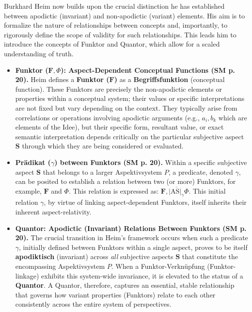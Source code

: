 \documentclass[12pt]{article}
\newcommand{\aspektivsystem}{P}
\newcommand{\funktor}{\bm{F}}
\begin{document}
Burkhard Heim now builds upon the crucial distinction he has established between apodictic (invariant) and non-apodictic (variant) elements. His aim is to formalize the nature of relationships between concepts and, importantly, to rigorously define the scope of validity for such relationships. This leads him to introduce the concepts of Funktor and Quantor, which allow for a scaled understanding of truth.

\begin{itemize}
    \item \textbf{Funktor (\( \funktor, \Phi \)): Aspect-Dependent Conceptual Functions (SM p. 20).}
    Heim defines a \textbf{Funktor (\(\funktor\))} as a \textbf{Begriffsfunktion} (conceptual function). These Funktors are precisely the non-apodictic elements or properties within a conceptual system; their values or specific interpretations are not fixed but vary depending on the context. They typically arise from correlations or operations involving apodictic arguments (e.g., \( a_i, b_k \) which are elements of the Idee), but their specific form, resultant value, or exact semantic interpretation depends critically on the particular subjective aspect \( \mathbf{S} \) through which they are being considered or evaluated. 

    \item \textbf{Prädikat (\( \gamma \)) between Funktors (SM p. 20).}
    Within a specific subjective aspect \( \mathbf{S} \) that belongs to a larger Aspektivsystem \( \aspektivsystem \), a predicate, denoted \( \gamma \), can be posited to establish a relation between two (or more) Funktors, for example, \( \funktor \) and \( \Phi \). This relation is expressed as: \( \funktor, \overline{|\mathrm{AS}|_{\gamma}} \Phi \). This initial relation \( \gamma \), by virtue of linking aspect-dependent Funktors, itself inherits their inherent aspect-relativity.

    \item \textbf{Quantor: Apodictic (Invariant) Relations Between Funktors (SM p. 20).}
    The crucial transition in Heim's framework occurs when such a predicate \( \gamma \), initially defined between Funktors within a single aspect, proves to be itself \textbf{apodiktisch} (invariant) across \textit{all} subjective aspects \( \mathbf{S} \) that constitute the encompassing Aspektivsystem \( \aspektivsystem \). When a Funktor-Verknüpfung (Funktor-linkage) exhibits this system-wide invariance, it is elevated to the status of a \textbf{Quantor}. A Quantor, therefore, captures an essential, stable relationship that governs how variant properties (Funktors) relate to each other consistently across the entire system of perspectives.


\end{itemize}
\end{document}
